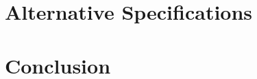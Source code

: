 \documentclass[letterpaper,12pt,final]{article}
\begin{document}








\section{Alternative Specifications}\label{sec:alternatives}















\section{Conclusion}\label{sec:conclusion}




\begingroup
{}
\clearpage

\endgroup
\end{document}
